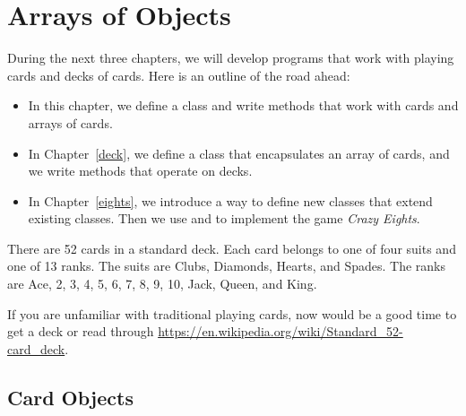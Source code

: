 \chapter{Arrays of Objects}

During the next three chapters, we will develop programs that work with playing cards and decks of cards.
Here is an outline of the road ahead:

\begin{itemize}

\item In this chapter, we define a  class and write methods that work with cards and arrays of cards.

\item In Chapter~\ref{deck}, we define a  class that encapsulates an array of cards, and we write methods that operate on decks.

\item In Chapter~\ref{eights}, we introduce a way to define new classes that extend existing classes.
Then we use  and  to implement the game {\it Crazy Eights}.

\end{itemize}





There are 52 cards in a standard deck.
Each card belongs to one of four suits and one of 13 ranks.
The suits are Clubs, Diamonds, Hearts, and Spades.
The ranks are Ace, 2, 3, 4, 5, 6, 7, 8, 9, 10, Jack, Queen, and King.

If you are unfamiliar with traditional playing cards, now would be a good time to get a deck or read through \url{https://en.wikipedia.org/wiki/Standard_52-card_deck}.


\section{Card Objects}


